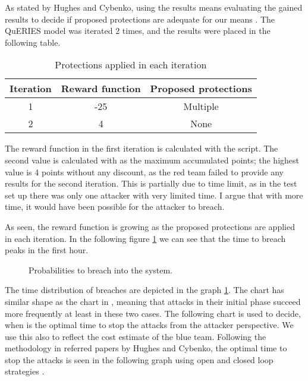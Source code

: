 As stated by Hughes and Cybenko, using the results means evaluating
the gained results to decide if proposed protections are adequate for
our means \cite{hughes2013quantitative}. The QuERIES model was
iterated 2 times, and the results were placed in the following table.

\begin{table}[h!]
\centering
\begin{tabular}{|c|c|c|}
  \hline Iteration & Reward function & Proposed protections \\ \hline
  1 & -25 & Multiple \\ \hline 2 & 4 & None \\ \hline
\end{tabular}
\caption{Protections applied in each iteration}
\label{iterationtable}
\end{table}

The reward function in the first iteration is calculated with the
script. The second value is calculated
with as the maximum accumulated points; the highest value is 4 points
without any discount, as the red team failed to provide any results
for the second iteration. This is partially due to time limit, as in
the test set up there was only one attacker with very limited time. I
argue that with more time, it would have been possible for the
attacker to breach.

As seen, the reward function is growing as the proposed protections
are applied in each iteration. In the following figure
\ref{timetobreach} we can see that the time to breach peaks in the
first hour.

\begin{figure}[t!]
\centerline{}
\caption{Probabilities to breach into the system.}
\label{timetobreach}
\end{figure}

The time distribution of breaches are depicted in the graph
\ref{timetobreach}. The chart has similar shape as the chart in
\cite{carin2008cybersecurity}, meaning that attacks in their initial
phase succeed more frequently at least in these two cases. The following chart is used to decide, when is the
optimal time to stop the attacks from the attacker perspective. We use
this also to reflect the cost estimate of the blue team. Following the
methodology in referred papers by Hughes and Cybenko, the optimal time
to stop the attacks is seen in the following graph using open and
closed loop strategies \cite{hughes2013quantitative,
  carin2008cybersecurity}.

